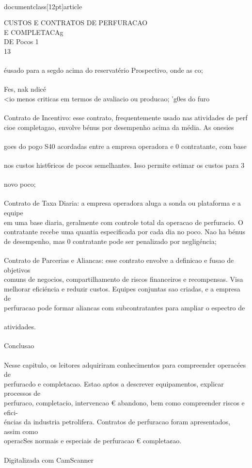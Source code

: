 \\documentclass[12pt]{article}
\begin{document}
CUSTOS E CONTRATOS DE PERFURACAO\\
E COMPLETACAg\\
DE Pocos 1\\
13\\
\\
éusado para a segdo acima do reservatério Prospectivo, onde as co;\\
\\
Fes, nak ndicé\\
<io menos criticas em termos de avaliacio ou producao; 'g0es do furo\\
\\
Contrato de Incentivo: esse contrato, frequentemente usado nas atividades de perf\\
cioe completagao, envolve bénus por desempenho acima da média. As onesies\\
\\
goes do pogo S40 acordadas entre a empresa operadora e 0 contratante, com base\\
\\
nos custos hist6ricos de pocos semelhantes. Isso permite estimar os custos para 3\\
\\
novo poco;\\
\\
Contrato de Taxa Diaria: a empresa operadora aluga a sonda ou plataforma e a equipe\\
em uma base diaria, geralmente com controle total da operacao de perfuracio. O\\
contratante recebe uma quantia especificada por cada dia no poco. Nao ha bénus\\
de desempenho, mas 0 contratante pode ser penalizado por negligéncia;\\
\\
Contrato de Parcerias e Aliancas: esse contrato envolve a definicao e fusao de objetivos\\
comuns de negocios, compartilhamento de riscos financeiros e recompensas. Visa\\
melhorar eficiéncia e reduzir custos. Equipes conjuntas sao criadas, e a empresa de\\
perfuracao pode formar aliancas com subcontratantes para ampliar o espectro de\\
\\
atividades.\\
\\
Conclusao\\
\\
Nesse capitulo, os leitores adquiriram conhecimentos para compreender operacées de\\
perfuracdo e completacao. Estao aptos a descrever equipamentos, explicar processos de\\
perfuraco, completacio, intervencao € abandono, bem como compreender riscos e efici-\\
éncias da industria petrolifera. Contratos de perfuracao foram apresentados, assim como\\
operacSes normais e especiais de perfuracao € completa¢ao.\\
\\
Digitalizada com CamScanner\\
\end{document}

